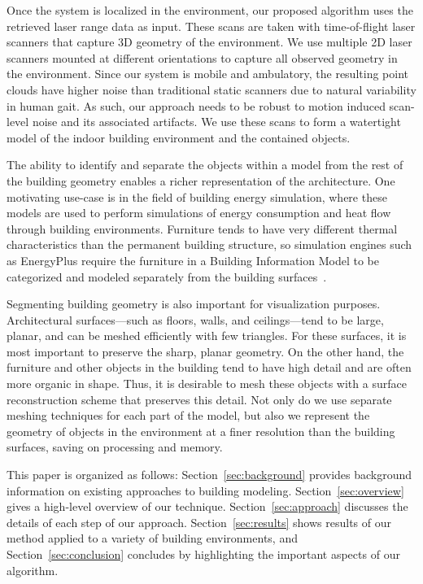 \documentclass[review]{acmsiggraph}
\begin{document}
Once the system is localized in the environment, our proposed algorithm uses the retrieved laser range data as input.  These scans are taken with time-of-flight laser scanners that capture 3D geometry of the environment.  We use multiple 2D laser scanners mounted at different orientations to capture all observed geometry in the environment.  Since our system is mobile and ambulatory, the resulting point clouds have higher noise than traditional static scanners due to natural variability in human gait.  As such, our approach needs to be robust to motion induced scan-level noise and its associated artifacts.  We use these scans to form a watertight model of the indoor building environment and the contained objects.


The ability to identify and separate the objects within a model from the rest of the building geometry enables a richer representation of the architecture.  One motivating use-case is in the field of building energy simulation, where these models are used to perform simulations of energy consumption and heat flow through building environments.  Furniture tends to have very different thermal characteristics than the permanent building structure, so simulation engines such as EnergyPlus require the furniture in a Building Information Model to be categorized and modeled separately from the building surfaces~\cite{EnergyPlus}.

Segmenting building geometry is also important for visualization purposes.  Architectural surfaces---such as floors, walls, and ceilings---tend to be large, planar, and can be meshed efficiently with few triangles.  For these surfaces, it is most important to preserve the sharp, planar geometry.  On the other hand, the furniture and other objects in the building tend to have high detail and are often more organic in shape.  Thus, it is desirable to mesh these objects with a surface reconstruction scheme that preserves this detail.  Not only do we use separate meshing techniques for each part of the model, but also we represent the geometry of objects in the environment at a finer resolution than the building surfaces, saving on processing and memory.

This paper is organized as follows:  Section~\ref{sec:background} provides background information on existing approaches to building modeling.  Section~\ref{sec:overview} gives a high-level overview of our technique.  Section~\ref{sec:approach} discusses the details of each step of our approach.  Section~\ref{sec:results} shows results of our method applied to a variety of building environments, and Section~\ref{sec:conclusion} concludes by highlighting the important aspects of our algorithm.
\end{document}
